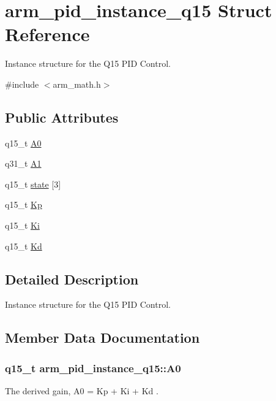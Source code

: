 \hypertarget{structarm__pid__instance__q15}{}\section{arm\+\_\+pid\+\_\+instance\+\_\+q15 Struct Reference}
\label{structarm__pid__instance__q15}


Instance structure for the Q15 P\+ID Control.  




{\ttfamily \#include $<$arm\+\_\+math.\+h$>$}

\subsection*{Public Attributes}
\begin{DoxyCompactItemize}
\item 
q15\+\_\+t \hyperlink{structarm__pid__instance__q15_ad77f3a2823c7f96de42c92a3fbf3246b}{A0}
\item 
q31\+\_\+t \hyperlink{structarm__pid__instance__q15_a1b8412c517071962a9acfdc6778906ec}{A1}
\item 
q15\+\_\+t \hyperlink{structarm__pid__instance__q15_a4a3f0a878b5b6b055e3478a2f244cd30}{state} \mbox{[}3\mbox{]}
\item 
q15\+\_\+t \hyperlink{structarm__pid__instance__q15_ad228aae24a1b6d855c93a8b9bbc1c4f1}{Kp}
\item 
q15\+\_\+t \hyperlink{structarm__pid__instance__q15_a0dcc19d5c8f7bc401acea9e8318cd777}{Ki}
\item 
q15\+\_\+t \hyperlink{structarm__pid__instance__q15_af5d4b53091f19eff7536636b7cc43111}{Kd}
\end{DoxyCompactItemize}


\subsection{Detailed Description}
Instance structure for the Q15 P\+ID Control. 

\subsection{Member Data Documentation}
\subsubsection[{\texorpdfstring{A0}{A0}}]{\setlength{\rightskip}{0pt plus 5cm}q15\+\_\+t arm\+\_\+pid\+\_\+instance\+\_\+q15\+::\+A0}\hypertarget{structarm__pid__instance__q15_ad77f3a2823c7f96de42c92a3fbf3246b}{}\label{structarm__pid__instance__q15_ad77f3a2823c7f96de42c92a3fbf3246b}
The derived gain, A0 = Kp + Ki + Kd . 
